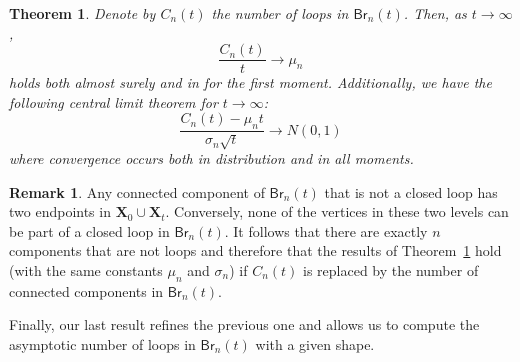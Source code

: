 \documentclass[a4paper,11pt,reqno]{amsart}
\newcommand{\paul}[1]{\todo[color=yellow!70,inline]{Paul: #1}}
\newcommand{\Br}{\mathsf{Br}}
\newtheorem{theorem}[lemma]{Theorem}
\theoremstyle{definition}
\newtheorem{remark}[lemma]{Remark}
\begin{document}
\begin{theorem}\label{theorem:CC}
 Denote by $C_n(t)$ the number of loops in $\Br_n(t)$. Then, as $t\to\infty$, 
 \begin{equation}\label{eq:CCLLN}
  \frac{C_n(t)}{t} \to \mu_n
 \end{equation}
 holds both almost surely and in for the first moment. Additionally, we have the following central limit theorem for $t\to\infty$:
 \begin{equation}\label{eq:CCCLT}
  \frac{C_n(t)-\mu_n t}{\sigma_n\sqrt{t}} \to N(0,1)
 \end{equation}
 where convergence occurs both in distribution and in all moments. 
\end{theorem}

\begin{remark}\label{rem:CC}
 Any connected component of $\Br_n(t)$ that is not a closed loop has two endpoints in $\mathbf{X}_{0} \cup \mathbf{X}_{t}$. Conversely, none of the vertices in these two levels can be part of a closed loop in $\Br_n(t)$. It follows that there are exactly $n$ components that are not loops and therefore that the results of Theorem~\ref{theorem:CC} hold (with the same constants $\mu_n$ and $\sigma_n$) if $C_n(t)$ is replaced by the number of connected components in $\Br_n(t)$. 
\end{remark}

% 

Finally, our last result refines the previous one and allows us to compute the asymptotic number of loops in $\Br_n(t)$ with a given shape.
\end{document}
